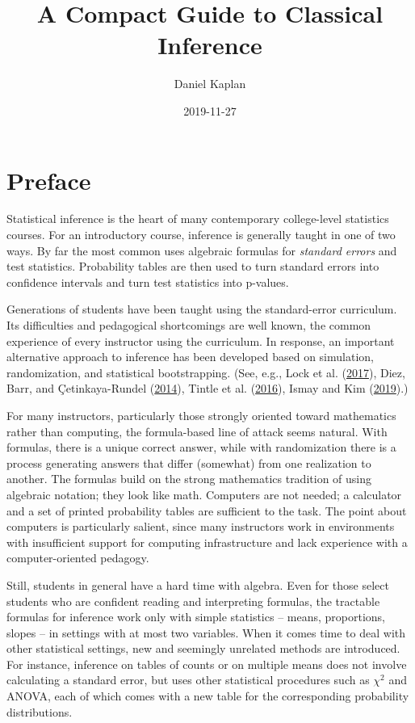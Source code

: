 \documentclass[]{tufte-book}
\title{A Compact Guide to Classical Inference}
\author{Daniel Kaplan}
\date{2019-11-27}
\begin{document}
\maketitle



{
\setcounter{tocdepth}{0}
\tableofcontents
}

\Large

\hypertarget{preface}{%
\chapter*{Preface}\label{preface}}

Statistical inference is the heart of many contemporary college-level statistics courses. For an introductory course, inference is generally taught in one of two ways. By far the most common uses algebraic formulas for \emph{standard errors} and test statistics. Probability tables are then used to turn standard errors into confidence intervals and turn test statistics into p-values.

Generations of students have been taught using the standard-error curriculum. Its difficulties and pedagogical shortcomings are well known, the common experience of every instructor using the curriculum. In response, an important alternative approach to inference has been developed based on simulation, randomization, and statistical bootstrapping. (See, e.g., Lock et al. (\protect\hyperlink{ref-lock5}{2017}), Diez, Barr, and Çetinkaya-Rundel (\protect\hyperlink{ref-ISRS}{2014}), Tintle et al. (\protect\hyperlink{ref-tintle-investigations}{2016}), Ismay and Kim (\protect\hyperlink{ref-modern-dive}{2019}).)

For many instructors, particularly those strongly oriented toward mathematics rather than computing, the formula-based line of attack seems natural. With formulas, there is a unique correct answer, while with randomization there is a process generating answers that differ (somewhat) from one realization to another. The formulas build on the strong mathematics tradition of using algebraic notation; they look like math. Computers are not needed; a calculator and a set of printed probability tables are sufficient to the task. The point about computers is particularly salient, since many instructors work in environments with insufficient support for computing infrastructure and lack experience with a computer-oriented pedagogy.

Still, students in general have a hard time with algebra. Even for those select students who are confident reading and interpreting formulas, the tractable formulas for inference work only with simple statistics -- means, proportions, slopes -- in settings with at most two variables. When it comes time to deal with other statistical settings, new and seemingly unrelated methods are introduced. For instance, inference on tables of counts or on multiple means does not involve calculating a standard error, but uses other statistical procedures such as \(\chi^2\) and ANOVA, each of which comes with a new table for the corresponding probability distributions.
\end{document}
